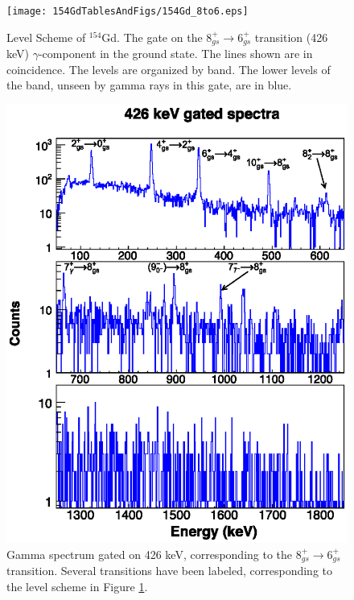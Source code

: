 \begin{figure}[!]
    \centering
    \texttt{[image: 154GdTablesAndFigs/154Gd\_8to6.eps]}
    \caption{Level Scheme of $^{154}$Gd. The gate on the $8_{gs}^+\rightarrow 6_{gs}^+$ transition (426 keV) $\gamma$-component in the ground state. The lines shown are in coincidence. The levels are organized by band. The lower levels of the band, unseen by gamma rays in this gate, are in blue. }
    \label{fig:154_8to6}
\end{figure}
\begin{figure}
    \centering
    \includegraphics[scale=1.3]{154GdTablesAndFigs/426_gamma.eps}
    \caption{Gamma spectrum gated on 426 keV, corresponding to the $8_{gs}^+\rightarrow 6_{gs}^+$ transition. Several transitions have been labeled, corresponding to the level scheme in Figure \ref{fig:154_8to6}.}
    \label{fig:154_8to6spec}
\end{figure}